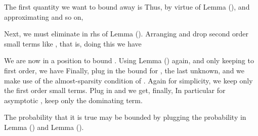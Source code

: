 The first quantity we want to bound away is
Thus, by virtue of Lemma (), and approximating  and so on,

Next, we must eliminate  in rhs of Lemma ().
Arranging and drop second order small terms like , that is,
doing this we have

We are now in a position to bound .
Using Lemma () again, and only keeping to first order, we have
Finally, plug in the bound for , the last unknown, and we make use of the almost-sparsity condition of .
Again for simplicity, we keep only the first order small terms.
Plug in  and  we get, finally,
In particular for asymptotic , keep only the dominating term.

The probability that it is true may be bounded by plugging the probability in Lemma () and Lemma ().

\stopsubsection
\stopsection


